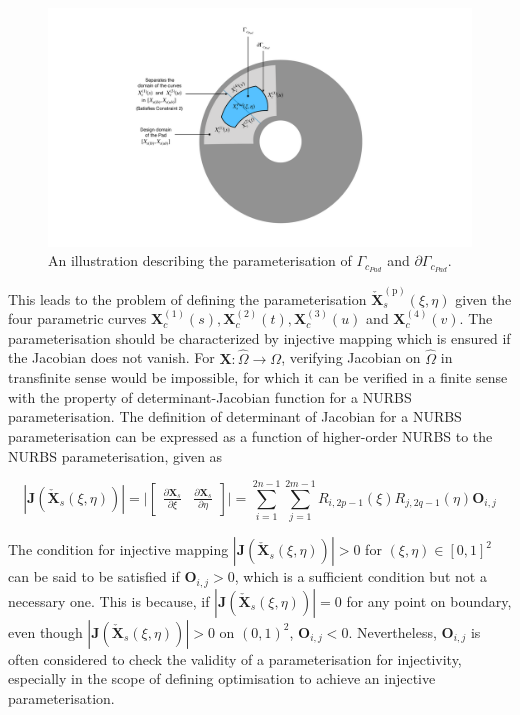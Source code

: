 \begin{figure}[h!]
    \centering
    \includegraphics[scale=0.3]{Chapter5/Pictures/des_dom.pdf}
    \caption{An illustration describing the parameterisation of $\Gamma_{c_{Pad}}$ and $\partial \Gamma_{c_{Pad}}.$  }
    \label{fig:Des_dom}
\end{figure}

This leads to the problem of defining the parameterisation $ \bm {\check{X}}_{s}^{(\mathrm p)}(\xi,\eta)$ given the four parametric curves $\bm X_c^{(1)}(s),\bm X_c^{(2)}(t),\bm X_c^{(3)}(u)$ and $\bm X_c^{(4)}(v)$.  The parameterisation should be characterized by injective mapping which is ensured if the Jacobian does not vanish. For $\bm X: \hat{\Omega}\rightarrow \Omega$, verifying Jacobian on $\hat{\Omega}$ in transfinite sense would be impossible, for which it can be verified in a finite sense with the property of determinant-Jacobian function for a NURBS parameterisation. The definition of determinant of Jacobian for a NURBS parameterisation can be expressed as a function of higher-order NURBS to the NURBS parameterisation, given as

\begin{equation}
|\bm J( \bm {\check{X}}_{s}(\xi,\eta) )|= \big|\begin{bmatrix}\frac{\partial \bm X_s}{\partial \xi} & \frac{\partial \bm X_s}{\partial \eta}\end{bmatrix}\big|= \sum_{i=1}^{2n-1}\sum_{j=1}^{2m-1}   R_{i,2p-1}(\xi)R_{j,2q-1}(\eta)\bm{O}_{i,j}
\end{equation}

The condition for injective mapping $|\bm J( \bm {\check{X}}_{s}(\xi,\eta) )|>0$ for $(\xi,\eta) \in [0,1]^2$ can be said to be satisfied if $\bm{O}_{i,j}>0$, which is  a sufficient condition but not a necessary one. This is because, if $|\bm J( \bm {\check{X}}_{s}(\xi,\eta) )|=0$ for any point on boundary, even though $|\bm J( \bm {\check{X}}_{s}(\xi,\eta) )|>0$ on $(0,1)^2$,  $\bm{O}_{i,j}<0$. Nevertheless, $\bm{O}_{i,j}$ is often considered to check the validity of a  parameterisation for injectivity, especially in the scope of defining optimisation to achieve an injective parameterisation.\\
 

